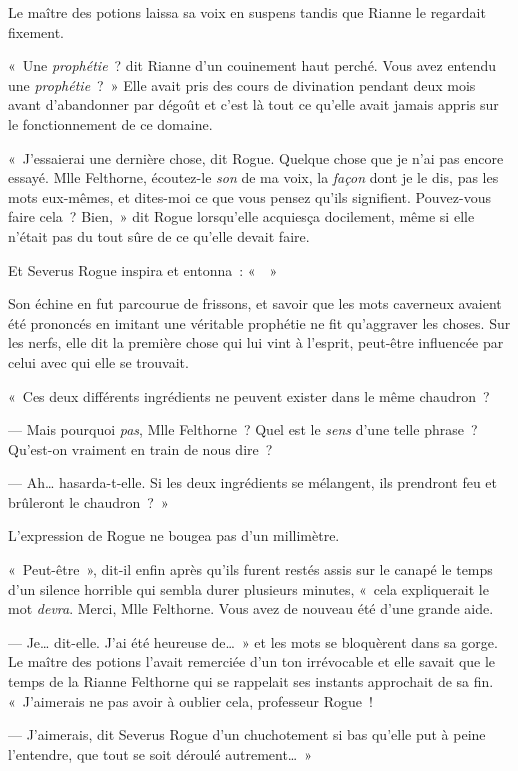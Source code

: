 Le maître des potions laissa sa voix en suspens tandis que Rianne le regardait fixement.

«~Une \emph{prophétie}~? dit Rianne d'un couinement haut perché.
Vous avez entendu une \emph{prophétie}~?~»
Elle avait pris des cours de divination pendant deux mois avant d'abandonner par dégoût et c'est là tout ce qu'elle avait jamais appris sur le fonctionnement de ce domaine.

«~J'essaierai une dernière chose, dit Rogue.
Quelque chose que je n'ai pas encore essayé.
Mlle Felthorne, écoutez-le \emph{son} de ma voix, la \emph{façon} dont je le dis, pas les mots eux-mêmes, et dites-moi ce que vous pensez qu'ils signifient.
Pouvez-vous faire cela~?
Bien,~» dit Rogue lorsqu'elle acquiesça docilement, même si elle n'était pas du tout sûre de ce qu'elle devait faire.

Et Severus Rogue inspira et entonna~: «~~»

Son échine en fut parcourue de frissons, et savoir que les mots caverneux avaient été prononcés en imitant une véritable prophétie ne fit qu'aggraver les choses.
Sur les nerfs, elle dit la première chose qui lui vint à l'esprit, peut-être influencée par celui avec qui elle se trouvait.

«~Ces deux différents ingrédients ne peuvent exister dans le même chaudron~?

--- Mais pourquoi \emph{pas}, Mlle Felthorne~?
Quel est le \emph{sens} d'une telle phrase~?
Qu'est-on vraiment en train de nous dire~?

--- Ah… hasarda-t-elle.
Si les deux ingrédients se mélangent, ils prendront feu et brûleront le chaudron~?~»

L'expression de Rogue ne bougea pas d'un millimètre.

«~Peut-être~», dit-il enfin après qu'ils furent restés assis sur le canapé le temps d'un silence horrible qui sembla durer plusieurs minutes, «~cela expliquerait le mot \emph{devra}.
Merci, Mlle Felthorne.
Vous avez de nouveau été d'une grande aide.

--- Je… dit-elle.
J'ai été heureuse de…~»
et les mots se bloquèrent dans sa gorge.
Le maître des potions l'avait remerciée d'un ton irrévocable et elle savait que le temps de la Rianne Felthorne qui se rappelait ses instants approchait de sa fin.
«~J'aimerais ne pas avoir à oublier cela, professeur Rogue~!

--- J'aimerais, dit Severus Rogue d'un chuchotement si bas qu'elle put à peine l'entendre, que tout se soit déroulé autrement…~»

